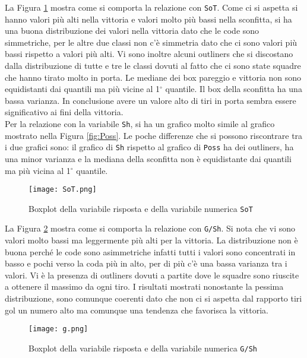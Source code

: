 La Figura \ref{fig:sot} mostra come si comporta la relazione con \texttt{SoT}. Come ci si aspetta si hanno valori più alti nella vittoria e valori molto più bassi nella sconfitta, si ha una buona distribuzione dei valori nella vittoria dato che le code sono simmetriche, per le altre due classi non c'è simmetria dato che ci sono valori più bassi rispetto a valori più alti. Vi sono inoltre alcuni outliners che si discostano dalla distribuzione di tutte e tre le classi dovuti al fatto che ci sono state squadre che hanno tirato molto in porta. Le mediane dei box pareggio e vittoria non sono equidistanti dai quantili ma più vicine al 1$^{\circ}$ quantile. Il box della sconfitta ha una bassa varianza. In conclusione avere un valore alto di tiri in porta sembra essere significativo ai fini della vittoria.\\

Per la relazione con la variabile \texttt{Sh}, si ha un grafico molto simile al grafico mostrato nella Figura \ref{fig:Poss}. Le poche differenze che si possono riscontrare tra i due grafici sono: il grafico di \texttt{Sh} rispetto al grafico di \texttt{Poss} ha dei outliners, ha una minor varianza e la mediana della sconfitta non è equidistante dai quantili ma più vicina al 1$^{\circ}$ quantile.\\

\begin{figure}[htbp]
	\begin{center}
		\texttt{[image: SoT.png]}
		\caption{Boxplot della variabile risposta e della variabile numerica \texttt{SoT} } \label{fig:sot}
	\end{center}
\end{figure}

La Figura \ref{fig:g} mostra come si comporta la relazione con \texttt{G/Sh}. Si nota che vi sono valori molto bassi ma leggermente più alti per la vittoria. La distribuzione non è buona perché le code sono asimmetriche infatti tutti i valori sono concentrati in basso e pochi verso la coda più in alto, per di più c'è una bassa varianza tra i valori. Vi è la presenza di outliners dovuti a partite dove le squadre sono riuscite a ottenere il massimo da ogni tiro. I risultati mostrati nonostante la pessima distribuzione, sono comunque coerenti dato che non ci si aspetta dal rapporto tiri gol un numero alto ma comunque una tendenza che favorisca la vittoria.\\

\begin{figure}[htbp]
	\begin{center}
		\texttt{[image: g.png]}
		\caption{Boxplot della variabile risposta e della variabile numerica \texttt{G/Sh} } \label{fig:g}
	\end{center}
\end{figure}

